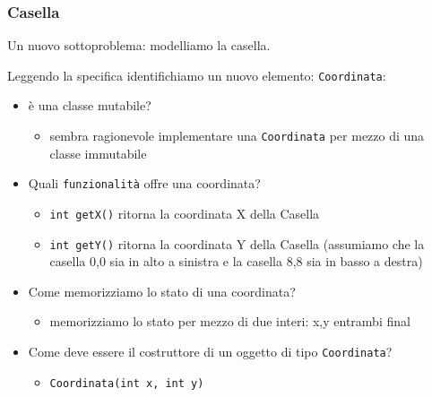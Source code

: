 \documentclass{article}
\begin{document}


\subsubsection{Casella}

Un nuovo sottoproblema: modelliamo la casella.


Leggendo la specifica identifichiamo un nuovo elemento: \texttt{Coordinata}: 

\begin{itemize}
\item \`e una classe mutabile?
\begin{itemize}
\item sembra ragionevole implementare una \texttt{Coordinata} per mezzo di una classe immutabile
\end{itemize}
\item Quali \texttt{funzionalit\`a} offre una coordinata? 
\begin{itemize}
\item \texttt{int getX()} ritorna la coordinata X della Casella
\item \texttt{int getY()} ritorna la coordinata Y della Casella (assumiamo che la casella 0,0 sia in alto a sinistra e la casella 8,8 sia in basso a destra)
\end{itemize}
\item Come memorizziamo lo stato di una coordinata?
\begin{itemize}
\item memorizziamo lo stato per mezzo di due interi: x,y entrambi final
\end{itemize}
\item Come deve essere il costruttore di un oggetto di tipo \texttt{Coordinata}?
\begin{itemize}
\item \texttt{Coordinata(int x, int y)}
\end{itemize}
\end{itemize}
\end{document}
